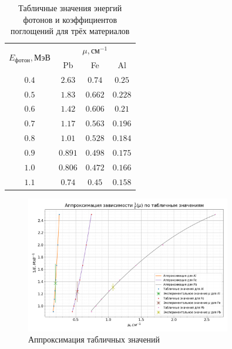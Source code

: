 \documentclass[a4paper, 12pt]{article}
\begin{document}
            \begin{table}[!ht]
                \centering
                \begin{tabular}{|c|c|c|c|}
                    \hline

                    \multirow{2}{*}{$E_{фотон}, МэВ$} & \multicolumn{3}{c|}{$\mu, см^{-1}$} \\ \cline{2-4}
                     & Pb & Fe & Al\\ \hline
                    $0.4$ & $2.63$ & $0.74$ & $0.25$\\ \hline
                    $0.5$ & $1.83$ & $0.662$ & $0.228$\\ \hline
                    $0.6$ & $1.42$ & $0.606$ & $0.21$\\ \hline
                    $0.7$ & $1.17$ & $0.563$ & $0.196$\\ \hline
                    $0.8$ & $1.01$ & $0.528$ & $0.184$\\ \hline
                    $0.9$ & $0.891$ & $0.498$ & $0.175$\\ \hline
                    $1.0$ & $0.806$ & $0.472$ & $0.166$\\ \hline
                    $1.1$ & $0.74$ & $0.45$ & $0.158$\\ \hline

                \end{tabular}
                \caption{Табличные значения энергий фотонов и коэффициентов поглощений для трёх материалов}
                \label{tab:lab_E}
            \end{table}

            \begin{figure}[ht!]
                \begin{center}
                    \includegraphics[width = 0.8\textwidth]{img/attenuation_factor_plot.png}
                    \caption{Аппроксимация табличных значений}
                    \label{plot:tab_approx}
                \end{center}
            \end{figure}
\end{document}
